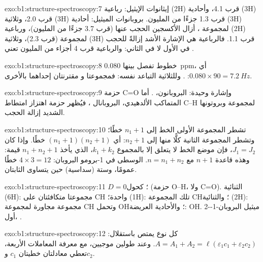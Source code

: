 \begin{solution}{exo:b1:structure-spectroscopy:7}
إيثانوات الإيثيل: رباعية (2H) قرب 4.1، وأحادية (3H) قرب 2.0، وثلاثية
(3H) قرب 1.3 جزءًا من المليون. بروبانوات الميثيل: أحادية (3H) لمجموعة ، أزال الأكسجين
الحجب عنها (قرب 3.7 جزءًا من المليون)، ورباعية (2H) لمجموعة  (قرب 2.3)، وثلاثية
(3H) قرب 1.1. فالرباعية هي الإشارة الأشد إزالةً للحجب في الأول
لا في الثاني: والرباعية قرب 4 أجزاء من المليون تعني .
\end{solution}

\begin{solution}{exo:b1:structure-spectroscopy:8}
خطوط تفصل بينها \qty{0.080}{ppm}، أي $0.080 \times 90 = \qty{7.2}{Hz}$:
. وللثلاثية التباعد نفسه: فمجموعتا 
و مقترنتان إحداهما بالأخرى.
\end{solution}

\begin{solution}{exo:b1:structure-spectroscopy:9}
حزمة C=O وإشارة وحيدة: البروبانون، . أما المتماكب
الألدهيدي، البروبانال ، فيُظهر حزمة اهتزاز امتطاط C--H لمجموعة
 وبروتونها الشديد إزالة الحجب.
\end{solution}

\begin{solution}{exo:b1:structure-spectroscopy:10}
تشطر المجموعة الأولى الخط إلى $n_1 + 1$ خطًا؛ وتشطر المجموعة الثانية كلًّا منها
إلى $n_2 + 1$: أي $(n_1 + 1)(n_2 + 1)$ خطًا. وإذا كان $J_1 =
J_2$، فإن موضع الخط لا يتعلق إلا بالمجموع $k_1 + k_2$، الذي يأخذ $n_1 + n_2 +
1$ قيمة: وهذه قاعدة $n + 1$ مع $n = n_1 + n_2$.  الوسطى في
1-برومو البروبان: $4 \times 3 = 12$ خطًا عمومًا، وستة (سداسية) حين
يتساوى الثابتان.
\end{solution}

\begin{solution}{exo:b1:structure-spectroscopy:11}
$D = 0$؛ كحول (حزمة O--H، ولا C=O). الثنائية (6H): مجموعتا 
متكافئتان على CH واحدة؛  (1H): تلك المجموعة CH؛ والثنائية (2H): مجموعة 
مجاورة لمجموعة CH وتحمل OH؛ والأحادية العريضة: OH.
2-ميثيل البروبان-1-أول، .
\end{solution}

\begin{solution}{exo:b1:structure-spectroscopy:12}
كل نوع يمتص باستقلال: $A = A_1 + A_2 = \ell(\varepsilon_1c_1
+ \varepsilon_2c_2)$. وعند طولين موجيين، مع معرفة المعاملات الأربعة،
تعطي معادلتان خطيتان $c_1$ و$c_2$.
\end{solution}

